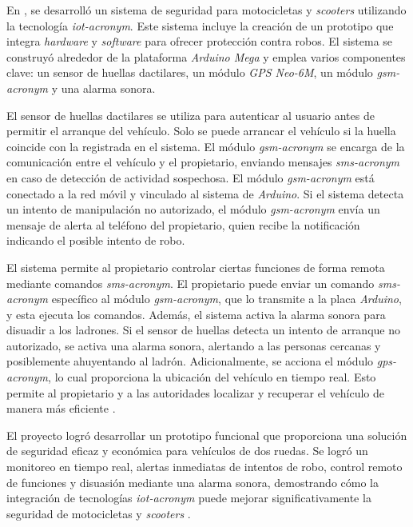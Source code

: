 En \cite{Rana}, se desarrolló un sistema de seguridad para motocicletas y \textit{scooters} utilizando la tecnología \textit{\acrshort{iot-acronym}}. Este sistema incluye la creación de un prototipo que integra \textit{hardware} y \textit{software} para ofrecer protección contra robos. El sistema se construyó alrededor de la plataforma \textit{Arduino Mega} y emplea varios componentes clave: un sensor de huellas dactilares, un módulo \textit{GPS Neo-6M}, un módulo \textit{\acrshort{gsm-acronym}} y una alarma sonora.

El sensor de huellas dactilares se utiliza para autenticar al usuario antes de permitir el arranque del vehículo. Solo se puede arrancar el vehículo si la huella coincide con la registrada en el sistema. El módulo \textit{\acrshort{gsm-acronym}} se encarga de la comunicación entre el vehículo y el propietario, enviando mensajes \textit{\acrshort{sms-acronym}} en caso de detección de actividad sospechosa. El módulo \textit{\acrshort{gsm-acronym}} está conectado a la red móvil y vinculado al sistema de \textit{Arduino}. Si el sistema detecta un intento de manipulación no autorizado, el módulo \textit{\acrshort{gsm-acronym}} envía un mensaje de alerta al teléfono del propietario, quien recibe la notificación indicando el posible intento de robo. 

El sistema permite al propietario controlar ciertas funciones de forma remota mediante comandos \textit{\acrshort{sms-acronym}}. El propietario puede enviar un comando \textit{\acrshort{sms-acronym}} específico al módulo \textit{\acrshort{gsm-acronym}}, que lo transmite a la placa \textit{Arduino}, y esta ejecuta los comandos. Además, el sistema activa la alarma sonora para disuadir a los ladrones. Si el sensor de huellas detecta un intento de arranque no autorizado, se activa una alarma sonora, alertando a las personas cercanas y posiblemente ahuyentando al ladrón. Adicionalmente, se acciona el módulo \textit{\acrshort{gps-acronym}}, lo cual proporciona la ubicación del vehículo en tiempo real. Esto permite al propietario y a las autoridades localizar y recuperar el vehículo de manera más eficiente \cite{Rana}.

El proyecto logró desarrollar un prototipo funcional que proporciona una solución de seguridad eficaz y económica para vehículos de dos ruedas. Se logró un monitoreo en tiempo real, alertas inmediatas de intentos de robo, control remoto de funciones y disuasión mediante una alarma sonora, demostrando cómo la integración de tecnologías \textit{\acrshort{iot-acronym}} puede mejorar significativamente la seguridad de motocicletas y \textit{scooters} \cite{Rana}.

